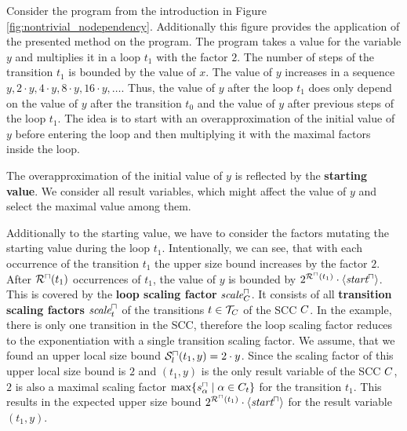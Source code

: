 \begin{example}
  
  Consider the program from the introduction in Figure \ref{fig:nontrivial_nodependency}.
  Additionally this figure provides the application of the presented method on the program.
  The program takes a value for the variable $y$ and multiplies it in a loop $t_1$ with the factor $2$.
  The number of steps of the transition $t_1$ is bounded by the value of $x$.
  The value of $y$ increases in a sequence $y, 2 \cdot y, 4 \cdot y, 8 \cdot y, 16 \cdot y, \dots$.
  Thus, the value of $y$ after the loop $t_1$ does only depend on the value of $y$ after the transition $t_0$ and the value of $y$ after previous steps of the loop $t_1$.
  The idea is to start with an overapproximation of the initial value of $y$ before entering the loop and then multiplying it with the maximal factors inside the loop.
  
  The overapproximation of the initial value of $y$ is reflected by the \textbf{starting value}.
  We consider all result variables, which might affect the value of $y$ and select the maximal value among them.
  
  Additionally to the starting value, we have to consider the factors mutating the starting value during the loop $t_1$.
  Intentionally, we can see, that with each occurrence of the transition $t_1$ the upper size bound increases by the factor $2$.
  After ${\mathcal{R}^\sqcap}(t_1)$ occurrences of $t_1$, the value of $y$ is bounded by $2^{{\mathcal{R}^\sqcap}(t_1)} \cdot \langle\emph{start}^\sqcap\rangle$.
  This is covered by the \textbf{loop scaling factor} $\emph{scale}^\sqcap_C$.
  It consists of all \textbf{transition scaling factors} $\emph{scale}^\sqcap_t$ of the transitions $t \in \mathcal{T}_C$ of the SCC $C$.
  In the example, there is only one transition in the SCC, therefore the loop scaling factor reduces to the exponentiation with a single transition scaling factor.
  We assume, that we found an upper local size bound ${\mathcal{S}^\sqcap_l}(t_1,y) = 2 \cdot y$.
  Since the scaling factor of this upper local size bound is $2$ and $(t_1,y)$ is the only result variable of the SCC $C$, $2$ is also a maximal scaling factor $\max \lbrace s^\sqcap_\alpha \mid \alpha \in C_t \rbrace$ for the transition $t_1$.
  This results in the expected upper size bound $2^{{\mathcal{R}^\sqcap}(t_1)} \cdot \langle\emph{start}^\sqcap\rangle$ for the result variable $(t_1,y)$.
\end{example}

